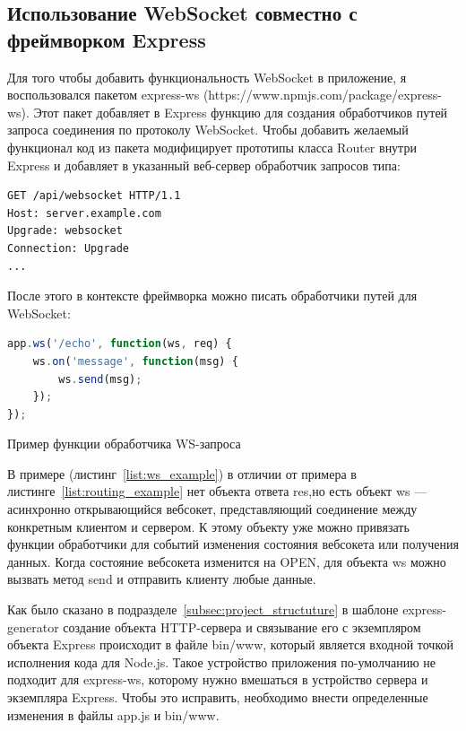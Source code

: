 \subsection{Использование WebSocket совместно с фреймворком Express}
Для того чтобы добавить функциональность WebSocket в приложение, я воспользовался пакетом express-ws (https://www.npmjs.com/package/express-ws). Этот пакет добавляет в Express функцию для создания обработчиков путей запроса соединения по протоколу WebSocket. Чтобы добавить желаемый функционал код из пакета модифицирует прототипы класса Router внутри Express и добавляет в указанный веб-сервер обработчик запросов типа:
\begin{lstlisting}[language]
GET /api/websocket HTTP/1.1
Host: server.example.com
Upgrade: websocket
Connection: Upgrade
...
\end{lstlisting}
После этого в контексте фреймворка можно писать обработчики путей для WebSocket:
\begin{ListingEnv}[H]
	\begin{lstlisting}[language=JavaScript]
app.ws('/echo', function(ws, req) {
	ws.on('message', function(msg) {
		ws.send(msg);
	});
});
	\end{lstlisting}
	\caption{Пример функции обработчика WS-запроса}
	\label{list:ws_example}
\end{ListingEnv}
В примере (листинг~\ref{list:ws_example}) в отличии от примера в листинге~\ref{list:routing_example} нет объекта ответа res,но есть объект ws --- асинхронно открывающийся вебсокет, представляющий соединение между конкретным клиентом и сервером. К этому объекту уже можно привязать функции обработчики для событий изменения состояния вебсокета или получения данных. Когда состояние вебсокета изменится на OPEN, для объекта ws можно вызвать метод send и отправить клиенту любые данные.   

Как было сказано в подразделе~\ref{subsec:project_structuture} в шаблоне express-generator создание объекта HTTP-сервера и связывание его с экземпляром объекта Express происходит в файле bin/www, который является входной точкой исполнения кода для Node.js. Такое устройство приложения по-умолчанию не подходит для express-ws, которому нужно вмешаться в устройство сервера и экземпляра Express. Чтобы это исправить, необходимо внести определенные изменения в файлы app.js и bin/www.

